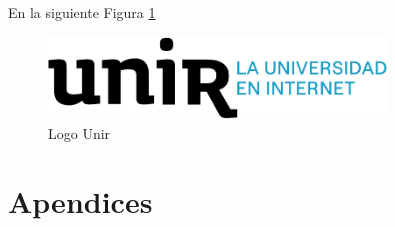 \documentclass[11pt,a4paper,spanish]{book}
\numberwithin{equation}{chapter}
\numberwithin{figure}{chapter}
\begin{document}
En la siguiente Figura \ref{fig:fig1secCTF}

\begin{figure}[h]
\includegraphics[width= 0.8\textwidth]{logo_unir}
\caption{Logo Unir}
\label{fig:fig1secCTF}
\end{figure}





\appendix
\chapter{Apendices}
\end{document}
